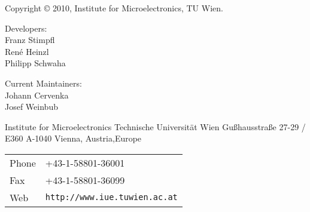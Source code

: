 
\clearpage

Copyright {\copyright} 2010, Institute for Microelectronics, TU Wien.

\vspace{2.5cm}

Developers:\\ 

Franz Stimpfl\\
Ren\'e Heinzl\\
Philipp Schwaha\\

\vspace{2.5cm}

Current Maintainers: \\

Johann Cervenka\\
Josef Weinbub\\


\vspace{5.0cm}

Institute for Microelectronics\newline
Technische Universit\"at Wien\newline
Gu\ss hausstra\ss e 27-29 / E360\newline
A-1040 Vienna, Austria,Europe\newline


\begin{tabular}{ll}
Phone  & +43-1-58801-36001\\
Fax    & +43-1-58801-36099\\
Web    & \texttt{http://www.iue.tuwien.ac.at}
\end{tabular}



